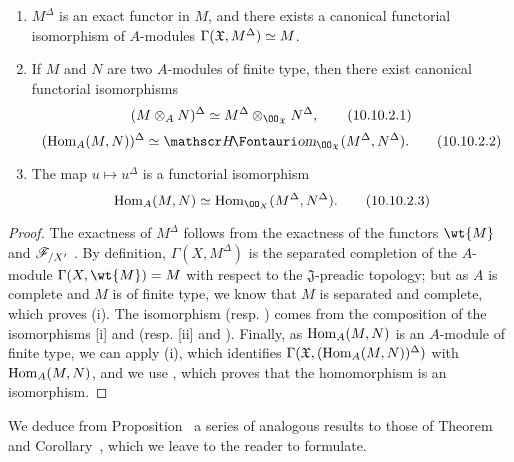 \begin{prop}[10.10.2]
\label{1.10.10.2}
\medskip\noindent
\begin{enumerate}[label=\emph{(\roman*)}]
  \item $M^\Delta$ is an exact functor in $M$, and there exists a canonical functorial isomorphism of $A$-modules $\Gamma(\mathfrak{X},M^\Delta)\simeq M$.
  \item If $M$ and $N$ are two $A$-modules of finite type, then there exist canonical functorial isomorphisms
    \begin{equation*}
    \label{1.10.10.2.1}
      (M\otimes_A N)^\Delta\isoto M^\Delta\otimes_{\OO_\mathfrak{X}}N^\Delta,
      \tag{10.10.2.1}
    \end{equation*}
    \begin{equation*}
    \label{1.10.10.2.2}
      (\Hom_A(M,N))^\Delta\isoto\shHom_{\OO_\mathfrak{X}}(M^\Delta,N^\Delta).
      \tag{10.10.2.2}
    \end{equation*}
  \item The map $u\mapsto u^\Delta$ is a functorial isomorphism
    \begin{equation*}
    \label{1.10.10.2.3}
      \Hom_A(M,N)\isoto\Hom_{\OO_X}(M^\Delta,N^\Delta).
      \tag{10.10.2.3}
    \end{equation*}
\end{enumerate}
\end{prop}

\begin{proof}
\label{proof-1.10.10.2}
The exactness of $M^\Delta$ follows from the exactness of the functors $\wt{M}$  and $\mathscr{F}_{/X'}$ .
By definition, $\Gamma(X,M^\Delta)$ is the separated completion of the $A$-module $\Gamma(X,\wt{M})=M$ with respect to the $\mathfrak{J}$-preadic topology; but as $A$ is complete and $M$ is of finite type, we know  that $M$ is separated and complete, which proves (i).
The isomorphism  (resp. ) comes from the composition of the isomorphisms [i] and  (resp. [ii] and ).
Finally, as $\operatorname{Hom}_A(M,N)$ is an $A$-module of finite type, we can apply (i), which identifies $\Gamma(\mathfrak{X},(\operatorname{Hom}_A(M,N))^\Delta)$ with $\operatorname{Hom}_A(M,N)$, and we use , which proves that the homomorphism  is an isomorphism.
\end{proof}

We deduce from Proposition~ a series of analogous results to those of Theorem~ and Corollary~, which we leave to the reader to formulate.

